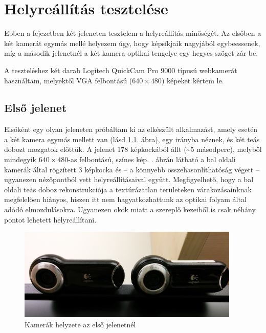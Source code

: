\chapter{Helyreállítás tesztelése}

Ebben a fejezetben két jeleneten tesztelem a helyreállítás minőségét. Az elsőben a két kamerát egymás mellé helyezem úgy, hogy képsíkjaik nagyjából egybeessenek, míg a második jelenetnél a két kamera optikai tengelye egy hegyes szöget zár be.

{\color{blue}
A teszteléshez két darab Logitech QuickCam Pro 9000 típusú webkamerát használtam, melyektől VGA felbontású ($640\times 480$) képeket kértem le.
}

\section{Első jelenet}

Elsőként egy olyan jeleneten próbáltam ki az elkészült alkalmazást, amely esetén a két kamera egymás mellett van (lásd \ref{fig:scene1_camerapose}. ábra), egy irányba néznek, és két teás dobozt mozgatok előttük. A jelenet 178 képkockából állt (\textasciitilde 5 másodperc), melyből mindegyik $640\times 480$-as felbontású, színes kép. . ábrán látható a bal oldali kamerák által rögzített 3 képkocka és -- a könnyebb összehasonlíthatóság végett -- ugyanezen nézőpontból vett helyreállításaival együtt. Megfigyelhető, hogy a bal oldali teás doboz rekonstrukciója a textúrázatlan területeken várakozásainknak megfelelően hiányos, hiszen itt nem hagyatkozhattunk az optikai folyam által adódó elmozdulásokra. Ugyanezen okok miatt a szereplő kezeiből is csak néhány pontot lehetett helyreállítani.

\begin{figure}[tbh]
\centering
\includegraphics[width=300pt]{figures/scene1_camerapose.jpg}
\caption{Kamerák helyzete az első jelenetnél \label{fig:scene1_camerapose}}
\end{figure}

